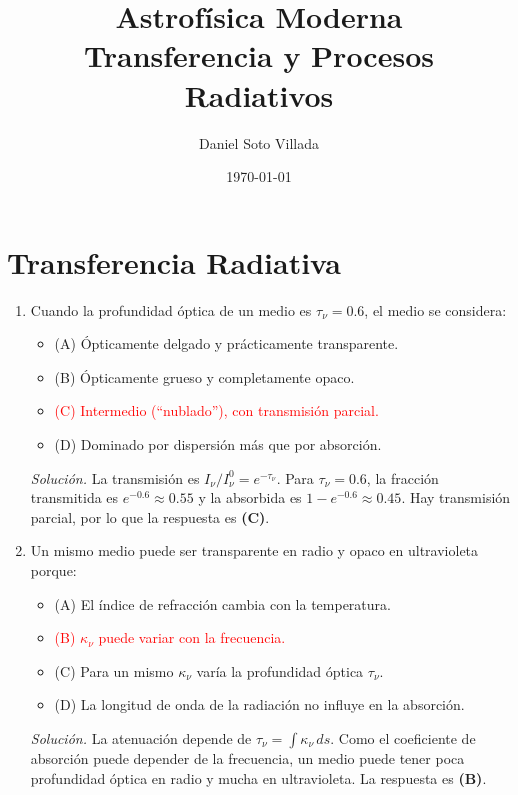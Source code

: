 \documentclass[11pt]{article}
\title{Astrofísica Moderna\\[0.4em]
\large Transferencia y Procesos Radiativos}
\author{Daniel Soto Villada}
\date{\today}
\begin{document}
\maketitle

\section{Transferencia Radiativa}
\begin{enumerate}
    \item Cuando la profundidad óptica de un medio es $\tau_\nu=0.6$, el medio se considera:
    \begin{itemize}
        \item (A) Ópticamente delgado y prácticamente transparente.
        \item (B) Ópticamente grueso y completamente opaco.
        \item \textcolor{red}{(C) Intermedio (``nublado''), con transmisión parcial.}
        \item (D) Dominado por dispersión más que por absorción.
    \end{itemize}
    \textit{Solución.} La transmisión es $I_\nu/I^0_\nu=e^{-\tau_\nu}$. Para $\tau_\nu=0.6$, la fracción transmitida es $e^{-0.6}\approx0.55$ y la absorbida es $1-e^{-0.6}\approx0.45$. Hay transmisión parcial, por lo que la respuesta es \textbf{(C)}. \parencite[Sec. 13.3.1, pp. 394--395]{chaparro2026}

    \item Un mismo medio puede ser transparente en radio y opaco en ultravioleta porque:
    \begin{itemize}
        \item (A) El índice de refracción cambia con la temperatura.
        \item \textcolor{red}{(B) $\kappa_\nu$ puede variar con la frecuencia.}
        \item (C) Para un mismo $\kappa_\nu$ varía la profundidad óptica $\tau_\nu$.
        \item (D) La longitud de onda de la radiación no influye en la absorción.
    \end{itemize}
    \textit{Solución.} La atenuación depende de $\tau_\nu=\int\kappa_\nu\,ds$. Como el coeficiente de absorción puede depender de la frecuencia, un medio puede tener poca profundidad óptica en radio y mucha en ultravioleta. La respuesta es \textbf{(B)}. \parencite[Secs. 13.2--13.3.1, pp. 390--395]{chaparro2026}


\end{enumerate}
\end{document}
